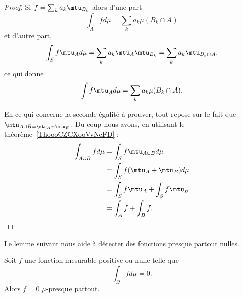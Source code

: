 \begin{proof}
    Si \( f=\sum_ka_k\mtu_{B_k}\) alors d'une part
    \begin{equation}
        \int_Afd\mu=\sum_ka_k\mu(B_k\cap A)
    \end{equation}
    et d'autre part,
    \begin{equation}
        \int_Sf\mtu_Ad\mu =\sum_ka_k\mtu_A\mtu_{B_k}=\sum_ka_k\mtu_{B_k\cap A},
    \end{equation}
    ce qui donne
    \begin{equation}
        \int f\mtu_Ad\mu=\sum_ka_k\mu(B_k\cap A).
    \end{equation}

    En ce qui concerne la seconde égalité à prouver, tout repose sur le fait que \( \mtu_{A\cup B=\mtu_A+\mtu_B}\). Du coup nous avons, en utilisant le théorème~\ref{ThoooCZCXooVvNcFD} :
    \begin{subequations}
        \begin{align}
            \int_{A\cup B}fd\mu&=\int_Sf\mtu_{A\cup B}d\mu\\
            &=\int_Sf(\mtu_A+\mtu_B)d\mu\\
            &=\int_Sf\mtu_A+\int_Sf\mtu_B\\
            &=\int_Af+\int_Bf.
        \end{align}
    \end{subequations}
\end{proof}

Le lemme suivant nous aide à détecter des fonctions presque partout nulles.
\begin{lemma}   \label{Lemfobnwt}
    Soit \( f\) une fonction mesurable positive ou nulle telle que
    \begin{equation}
        \int_{\Omega}fd\mu=0.
    \end{equation}
    Alors \( f=0\) \( \mu\)-presque partout.
\end{lemma}

